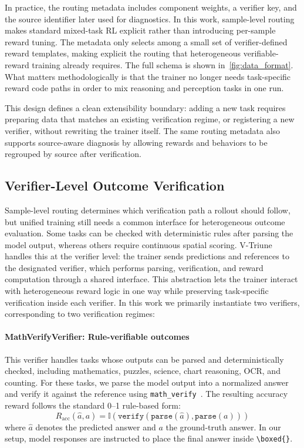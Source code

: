 In practice, the routing metadata includes component weights, a verifier key, and the source identifier later used for diagnostics.
%
In this work, sample-level routing makes standard mixed-task RL explicit rather than introducing per-sample reward tuning.
%
The metadata only selects among a small set of verifier-defined reward templates, making explicit the routing that heterogeneous verifiable-reward training already requires.
%
The full schema is shown in~\cref{fig:data_format}.
%
What matters methodologically is that the trainer no longer needs task-specific reward code paths in order to mix reasoning and perception tasks in one run.

This design defines a clean extensibility boundary: adding a new task requires preparing data that matches an existing verification regime, or registering a new verifier, without rewriting the trainer itself.
%
The same routing metadata also supports source-aware diagnosis by allowing rewards and behaviors to be regrouped by source after verification.

\subsection{Verifier-Level Outcome Verification}
\label{subsec:verifier_level_reward_computation}

Sample-level routing determines which verification path a rollout should follow, but unified training still needs a common interface for heterogeneous outcome evaluation.
%
Some tasks can be checked with deterministic rules after parsing the model output, whereas others require continuous spatial scoring.
%
V-Triune handles this at the verifier level: the trainer sends predictions and references to the designated verifier, which performs parsing, verification, and reward computation through a shared interface.
%
This abstraction lets the trainer interact with heterogeneous reward logic in one way while preserving task-specific verification inside each verifier.
%
In this work we primarily instantiate two verifiers, corresponding to two verification regimes:
%
\noindent\paragraph{MathVerifyVerifier: Rule-verifiable outcomes}
This verifier handles tasks whose outputs can be parsed and deterministically checked, including mathematics, puzzles, science, chart reasoning, OCR, and counting.
%
For these tasks, we parse the model output into a normalized answer and verify it against the reference using \texttt{math\_verify}~\citep{mathverify2025}.
%
The resulting accuracy reward follows the standard 0--1 rule-based form:
%
\begin{equation}
    R_\text{acc}(\hat{a}, a) = \mathbb{I}(\texttt{verify}(\texttt{parse}(\hat{a}), \texttt{parse}(a)))
    \label{eq:math_rule}
\end{equation}
%
where $\hat{a}$ denotes the predicted answer and $a$ the ground-truth answer.
%
In our setup, model responses are instructed to place the final answer inside \texttt{\textbackslash boxed\{\}}.

